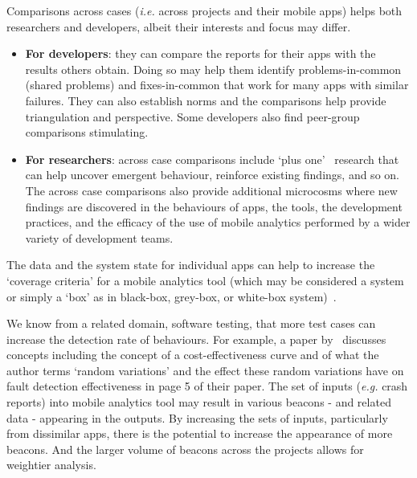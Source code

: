 Comparisons across cases (\textit{i.e.} across projects and their mobile apps) helps both researchers and developers, albeit their interests and focus may differ.

\begin{itemize}
    \item \textbf{For developers}: they can compare the reports for their apps with the results others obtain. Doing so may help them identify problems-in-common (shared problems) and fixes-in-common that work for many apps with similar failures. They can also establish norms and the comparisons help provide triangulation and perspective. Some developers also find peer-group comparisons stimulating.
    
    \item \textbf{For researchers}: across case comparisons include `plus one'~\citep[pp 28-29]{aurini2016_how_to_of_qualitative_research} research that can help uncover emergent behaviour, reinforce existing findings, and so on. The across case comparisons also provide additional microcosms where new findings are discovered in the behaviours of apps, the tools, the development practices, and the efficacy of the use of mobile analytics performed by a wider variety of development teams.
\end{itemize}


The data and the system state for individual apps can help to increase the `coverage criteria' for a mobile analytics tool (which may be considered a system or simply a `box' as in black-box, grey-box, or white-box system)~. 

We know from a related domain, software testing, that more test cases can increase the detection rate of behaviours. For example, a paper by~\citet{briand2007_a_critical_analysis_of_empirical_research_in_software_testing} discusses concepts including the concept of a cost-effectiveness curve and of what the author terms `random variations' and the effect these random variations have on fault detection effectiveness in page 5 of their paper. The set of inputs (\textit{e.g.} crash reports) into mobile analytics tool may result in various beacons - and related data - appearing in the outputs. By increasing the sets of inputs, particularly from dissimilar apps, there is the potential to increase the appearance of more beacons. And the larger volume of beacons across the projects allows for weightier analysis.

